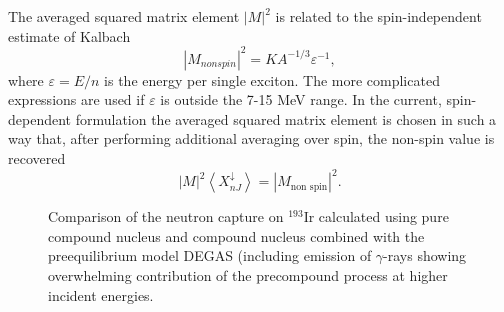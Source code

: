 \documentclass[twocolumn,amsmath,amssymb,10pt,groupedaddress,letter]{revtex4}
\begin{document}
The averaged squared matrix element $|M|^{2}$ is related to the spin-independent
estimate of Kalbach \cite{Kalbach}
\begin{equation}
|M_{nonspin}|^{2}=KA^{-1/3}\varepsilon^{-1},
\end{equation}
\noindent where $\varepsilon=E/n$ is the energy per single exciton. The more
complicated expressions \cite{Kalbach} are used if $\varepsilon$
is outside the 7-15 MeV range. In the current, spin-dependent formulation
the averaged squared matrix element is chosen in such a way that,
after performing additional averaging over spin, the non-spin value
is recovered
\begin{equation}
|M|^{2}\left\langle X_{nJ}^{\downarrow}\right\rangle =|M_{\text{non spin}}|^{2}.
\end{equation}
\begin{figure}[htbp]
\caption{Comparison of the neutron capture on $^{193}$Ir calculated using pure compound nucleus and compound nucleus combined with the preequilibrium model DEGAS (including emission of $\gamma$-rays showing overwhelming contribution of the precompound process at higher incident energies. }
\label{ir193}
\end{figure}
\end{document}
